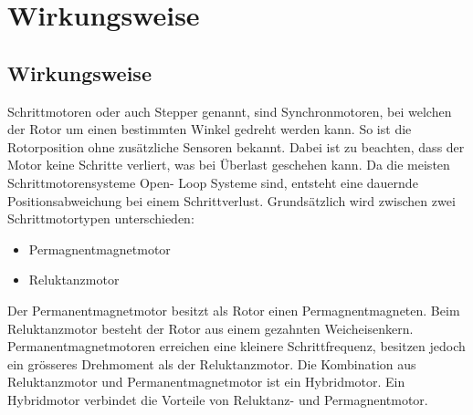 \ifSTANDALONE
\section{Wirkungsweise} \label{wirkungsweise}
\fi
\ifEMBED
\subsection{Wirkungsweise} \label{wirkungsweise}
\fi

\ifEMBED
    \BLDCcollab
\fi
    
    Schrittmotoren oder auch Stepper genannt, sind Synchronmotoren, bei 
    welchen der Rotor um einen bestimmten Winkel gedreht werden kann. So ist 
    die Rotorposition ohne zusätzliche Sensoren bekannt. Dabei ist zu 
    beachten, dass der Motor keine Schritte verliert, was bei Überlast 
    geschehen kann. Da die meisten Schrittmotorensysteme Open- Loop Systeme 
    sind, entsteht eine dauernde Positionsabweichung bei einem Schrittverlust. 
    Grundsätzlich wird zwischen zwei Schrittmotortypen unterschieden: 
    \begin{itemize}
       	\item Permagnentmagnetmotor
       	\item Reluktanzmotor
    \end{itemize} 
    Der Permanentmagnetmotor besitzt als Rotor einen Permagnentmagneten. Beim 
    Reluktanzmotor besteht der Rotor aus einem gezahnten Weicheisenkern. 
    Permanentmagnetmotoren erreichen eine kleinere Schrittfrequenz, besitzen 
    jedoch ein grösseres Drehmoment als der Reluktanzmotor. Die Kombination 
    aus Reluktanzmotor und Permanentmagnetmotor ist ein Hybridmotor. Ein 
    Hybridmotor verbindet die Vorteile von Reluktanz- und Permagnentmotor.
    
